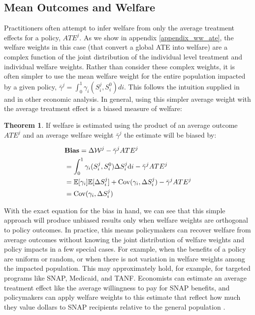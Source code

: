 \documentclass[12pt]{article}
\theoremstyle{definition}
\theoremstyle{definition}
\theoremstyle{definition}
\theoremstyle{definition}
\newtheorem{thm}{Theorem}
\begin{document}
    
    
    \subsection{Mean Outcomes and Welfare}

    Practitioners often attempt to infer welfare from only the average treatment effects for a policy, $ATE^j$. As we show in appendix \ref{appendix_ww_ate}, the welfare weights in this case (that convert a global ATE into welfare) are a complex function of the joint distribution of the individual level treatment and individual welfare weights. Rather than consider these complex weights, it is often simpler to use the mean welfare weight for the entire population impacted by a given policy, $\bar{\gamma}^j = \int_0^1 \gamma_i(S_i^j, S_i^0) di$. This follows the intuition supplied in \cite{Keyser_2020} and in other economic analysis. In general, using this simpler average weight with the average treatment effect is a biased measure of welfare:
    
  \begin{thm}
    If welfare is estimated using the product of an average outcome $ATE^j$ and an average welfare weight $\bar{\gamma}^j$ the estimate will be biased by: 
    
    \begin{align}
       & \textbf{Bias} = \Delta \mathcal{W}^j - \bar{\gamma}^j ATE^j \\
       & =   \int_0^1 \gamma_i(S_i^j, S_i^0) \Delta S^j_i \text{d}i - \bar{\gamma}^j ATE^j  \\
       & =  \mathbb{E}[\gamma_i] \mathbb{E}[\Delta S^j_i] + \mathrm{Cov}(\gamma_i, \Delta S^j_i) - \bar{\gamma}^j ATE^j  \\
       & = \mathrm{Cov}(\gamma_i, \Delta S^j_i)
    \end{align}
    \end{thm}

    With the exact equation for the bias in hand, we can see that this simple approach will produce unbiased results only when welfare weights are orthogonal to policy outcomes. In practice, this means policymakers can recover welfare from average outcomes without knowing the joint distribution of welfare weights and policy impacts in a few special cases. For example, when the benefits of a policy are uniform or random, or when there is not variation in welfare weights among the impacted population. This may approximately hold, for example, for targeted programs like SNAP, Medicaid, and TANF. Economists can estimate an average treatment effect like the average willingness to pay for SNAP benefits, and policymakers can apply welfare weights to this estimate that reflect how much they value dollars to SNAP recipients relative to the general population \citep{Keyser_2020}. 
    
\end{document}
